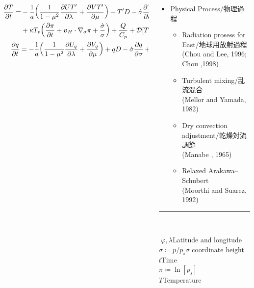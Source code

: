 \documentclass[aspectratio=149,9pt,fleqn,tbtags]{beamer}
\begin{document}
\begin{frame}
\begin{columns}
\begin{column}{.55\textwidth}
\begin{gather}
\begin{split}
					\pdv{T}{t}=&-\frac{1}{a}\qty(\frac{1}{1-\mu^2}\pdv{UT'}{\lambda}
						+\pdv{VT'}{\mu})+T'D-\dot\sigma\pdv{T}{\sigma}\\
					&+\kappa T_v\qty(\pdv{\pi}{t}+\vb*{v}_H\cdot\nabla_\sigma\pi+\frac{\dot\sigma}{\sigma})
						+\frac{Q}{C_p}+\mathcal{D}[T]+\mathcal{D}'[\vb*{v}],
				\end{split}\tag{Thermodynamics}\\
				\pdv{q}{t}=-\frac{1}{a}\qty(\frac{1}{1-\mu^2}\pdv{U_q}{\lambda}+\pdv{V_q}{\mu})
				+qD-\dot\sigma\pdv{q}{\sigma}+S_q+\mathcal{D}[q].\tag{Water Vapor}
			\end{gather}
		\end{column}
		\begin{column}{.45\textwidth}
			\begin{itemize}
				\item Physical Process/物理過程
					\begin{itemize}
						\scriptsize
						\item Radiation prosess for East/{地球用放射過程}\\
							(Chou and Lee, 1996; Chou \etal*,1998)
						\item Turbulent mixing/{乱流混合}\\
							(Mellor and Yamada, 1982)
						\item Dry convection adjustment/{乾燥対流調節}\\
							(Manabe \etal*, 1965)
						\item Relaxed Arakawa--Schubert\\
							(Moorthi and Suarez, 1992)
					\end{itemize}
			\end{itemize}
			\begin{table}[b]
				\tiny
				\centering
				\begin{minipage}{\textwidth}
					\rule[0pt]{\textwidth}{\heavyrulewidth}\\%
					\begin{minipage}{.5\textwidth}
						\hfill
						\begin{tabbing}
							\hspace*{3\zw}\=\kill
							\(\varphi,\lambda\)\>Latitude and longitude\\
							\(\sigma\coloneqq p/p_s\)\quad\(\sigma\) coordinate height\\
							\(t\)\>Time\\
							\(\pi\coloneqq\ln[p_s]\)\\
							\(T\)\>Temperature\\

\end{tabbing}
\end{minipage}
\end{minipage}
\end{table}
\end{column}
\end{columns}
\end{frame}
\end{document}
